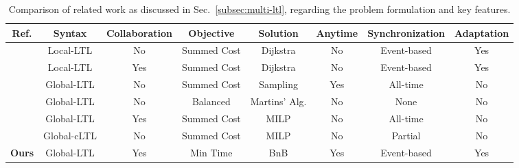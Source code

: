 \begin{table*}[t]
  \begin{center}
    \caption{Comparison of related work as discussed in Sec.~\ref{subsec:multi-ltl},
  regarding the problem formulation and key features.}
\label{table:compare}
\begin{adjustbox}{width=0.8\linewidth}
{\def\arraystretch{1.2}\tabcolsep=3pt
\begin{tabular}{cccccccc}
\toprule
Ref. & Syntax & Collaboration & Objective  & Solution & Anytime & Synchronization & Adaptation \\ \midrule
\cite{guo2015multi, tumova2016multi} & Local-LTL & No & Summed Cost & Dijkstra & No & Event-based  & Yes\\
\cite{guo2016task} & Local-LTL & Yes & Summed Cost & Dijkstra &  No & Event-based  & Yes \\
\cite{kantaros2020stylus, luo2021abstraction} & Global-LTL & No & Summed Cost & Sampling & Yes & All-time & No \\
\cite{schillinger2018simultaneous} & Global-LTL & No & Balanced & Martins' Alg.  & No & None & No \\
\cite{luo2021temporal} & Global-LTL & Yes & Summed Cost & MILP & No & All-time & No \\
\cite{sahin2019multirobot, jones2019scratchs} & Global-cLTL & No & Summed Cost & MILP & No & Partial & No \\
\textbf{Ours} & Global-LTL & Yes & Min Time & BnB & Yes & Event-based & Yes \\
\bottomrule
\end{tabular}%
}
\end{adjustbox}
\end{center}
\end{table*}

